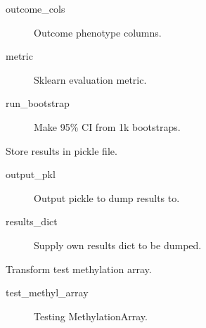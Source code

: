 \documentclass[letterpaper,10pt,english]{sphinxmanual}
\begin{document}
\begin{fulllineitems}
\begin{fulllineitems}
\begin{description}
\item[{outcome\_cols}] \leavevmode
Outcome phenotype columns.

\item[{metric}] \leavevmode
Sklearn evaluation metric.

\item[{run\_bootstrap}] \leavevmode
Make 95\% CI from 1k bootstraps.

\end{description}

\end{fulllineitems}


\begin{fulllineitems}
\label{\detokenize{index:pymethylprocess.general_machine_learning.MachineLearning.store_results}}
Store results in pickle file.
\begin{description}
\item[{output\_pkl}] \leavevmode
Output pickle to dump results to.

\item[{results\_dict}] \leavevmode
Supply own results dict to be dumped.

\end{description}

\end{fulllineitems}


\begin{fulllineitems}
\label{\detokenize{index:pymethylprocess.general_machine_learning.MachineLearning.transform}}
Transform test methylation array.
\begin{description}
\item[{test\_methyl\_array}] \leavevmode
Testing MethylationArray.

\end{description}

\end{fulllineitems}


\end{fulllineitems}
\end{document}
